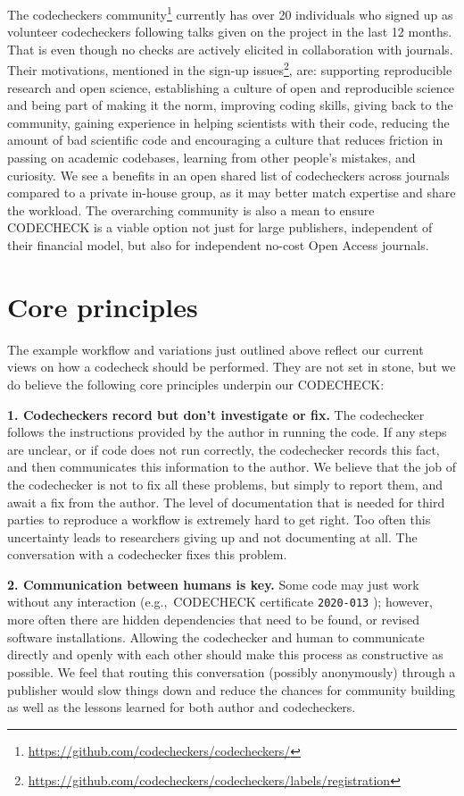 \documentclass[12pt]{article}
\begin{document}
The codecheckers community\footnote{\href{https://github.com/codecheckers/codecheckers/}{https://github.com/codecheckers/codecheckers/}}
currently has over 20 individuals who signed up as volunteer codecheckers
following talks given on the project in the last 12 months.
That is even though no checks are actively elicited in collaboration
with journals.
Their motivations, mentioned in the sign-up issues\footnote{
\url{https://github.com/codecheckers/codecheckers/labels/registration}},
are:
supporting reproducible research and open science,
establishing a culture of open and reproducible science and being part
of making it the norm,
improving coding skills,
giving back to the community,
gaining experience in helping scientists with their code,
reducing the amount of bad scientific code and encouraging a culture that
reduces friction in passing on academic codebases,
learning from other people's mistakes,
and curiosity.
We see a benefits in an open shared list of codecheckers
across journals
compared to a private in-house group, as it may better match expertise
and share the workload.
The overarching community is also a mean to ensure CODECHECK is a viable
option not just for large publishers, independent of their financial model,
but also for independent no-cost Open Access journals.

\section*{Core principles}\label{core-principles}

The example workflow and variations just outlined above reflect our current
views on how a codecheck should be performed. They are not set in
stone, but we do believe the following core principles underpin our
CODECHECK:

\textbf{1. Codecheckers record but don't investigate or fix.} The
codechecker follows the instructions provided by the author in running
the code. If any steps are unclear, or if code does not run correctly,
the codechecker records this fact, and then communicates this
information to the author. We believe that the job of the codechecker is
not to fix all these problems, but simply to report them, and await a
fix from the author.
The level of documentation that is needed for third parties
to reproduce a workflow is extremely hard to get right. Too often this 
uncertainty leads to researchers giving up and not documenting at all.
The conversation with a codechecker fixes this problem.

\textbf{2. Communication between humans is key.} Some code may just
work without any interaction (e.g.,~CODECHECK certificate \texttt{2020-013}
\cite{cert-2020-013}); however, more often there are hidden
dependencies that need to be found, or revised software
installations. Allowing the codechecker and human to communicate
directly and openly with each other should make this process as
constructive as possible. We feel that routing this conversation
(possibly anonymously) through a publisher would slow things down and
reduce the chances for community building as well as the lessons
learned for both author and codecheckers.
\end{document}
